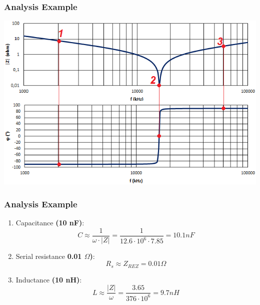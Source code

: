 \documentclass{beamer}
\begin{document}
	\begin{frame}
    \frametitle{Analysis Example}
		
		\begin{center}
			\includegraphics[scale=0.6]{obr09_prikladC.png}
		\end{center}
	\end{frame}
	\begin{frame}
    \frametitle{Analysis Example}
		
		\begin{enumerate}
		\setcounter{enumi}{0}
			\item Capacitance \textbf{(10 nF)}: $$C\approx \frac{1}{\omega \cdot \left|Z\right|}= \frac{1}{12.6\cdot 10^6\cdot7.85}= 10.1 nF$$
			\item Serial resistance \textbf{0.01 $\Omega$)}: $$R_s \approx Z_{REZ} = 0.01\Omega$$
			\item Inductance \textbf{(10 nH)}: $$L\approx \frac{\left|Z\right|}{\omega}= \frac{3.65}{376\cdot 10^6}= 9.7 nH$$
		\end{enumerate}
	\end{frame}
\end{document}
